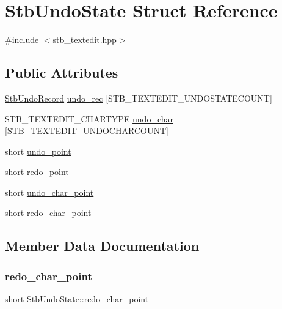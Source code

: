 \hypertarget{struct_stb_undo_state}{}\section{Stb\+Undo\+State Struct Reference}
\label{struct_stb_undo_state}


{\ttfamily \#include $<$stb\+\_\+textedit.\+hpp$>$}

\subsection*{Public Attributes}
\begin{DoxyCompactItemize}
\item 
\hyperlink{struct_stb_undo_record}{Stb\+Undo\+Record} \hyperlink{struct_stb_undo_state_a8cb07be8f304d1620b50bd024709023f}{undo\+\_\+rec} \mbox{[}S\+T\+B\+\_\+\+T\+E\+X\+T\+E\+D\+I\+T\+\_\+\+U\+N\+D\+O\+S\+T\+A\+T\+E\+C\+O\+U\+NT\mbox{]}
\item 
S\+T\+B\+\_\+\+T\+E\+X\+T\+E\+D\+I\+T\+\_\+\+C\+H\+A\+R\+T\+Y\+PE \hyperlink{struct_stb_undo_state_a88320a054aaf18ca122c2b23903a8677}{undo\+\_\+char} \mbox{[}S\+T\+B\+\_\+\+T\+E\+X\+T\+E\+D\+I\+T\+\_\+\+U\+N\+D\+O\+C\+H\+A\+R\+C\+O\+U\+NT\mbox{]}
\item 
short \hyperlink{struct_stb_undo_state_ad29a8695b3e8252ac164d0c2d0be7d7c}{undo\+\_\+point}
\item 
short \hyperlink{struct_stb_undo_state_a719ba014b2db8a8ea55739664b445af0}{redo\+\_\+point}
\item 
short \hyperlink{struct_stb_undo_state_ad5c08b1f8c24678c44407f0ca805afcf}{undo\+\_\+char\+\_\+point}
\item 
short \hyperlink{struct_stb_undo_state_a928f655e4af8945a14d99e944441704a}{redo\+\_\+char\+\_\+point}
\end{DoxyCompactItemize}


\subsection{Member Data Documentation}
\hypertarget{struct_stb_undo_state_a928f655e4af8945a14d99e944441704a}{}\label{struct_stb_undo_state_a928f655e4af8945a14d99e944441704a} 
\subsubsection{\texorpdfstring{redo\+\_\+char\+\_\+point}{redo\_char\_point}}
{\footnotesize\ttfamily short Stb\+Undo\+State\+::redo\+\_\+char\+\_\+point}

